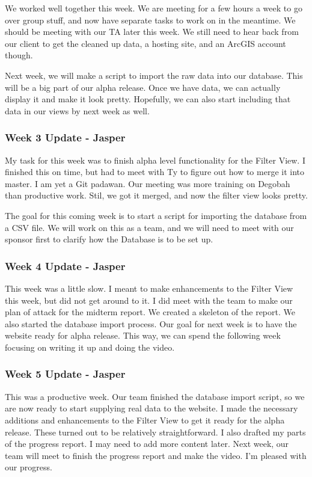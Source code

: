 We worked well together this week. 
We are meeting for a few hours a week to go over group stuff, and now have separate tasks to work on in the meantime. 
We should be meeting with our TA later this week. 
We still need to hear back from our client to get the cleaned up data, a hosting site, and an ArcGIS account though.

Next week, we will make  a script to import the raw data into our database. 
This will be a big part of our alpha release. 
Once we have data, we can actually display it and make it look pretty. 
Hopefully, we can also start including that data in our views by next week as well.

\subsubsection{Week 3 Update - Jasper}
My task for this week was to finish alpha level functionality for the Filter View. 
I finished this on time, but had to meet with Ty to figure out how to merge it into master. 
I am yet a Git padawan. 
Our meeting was more training on Degobah than productive work. 
Stil, we got it merged, and now the filter view looks pretty.

The goal for this coming week is to start a script for importing the database from a CSV file. 
We will work on this as a team, and we will need to meet with our sponsor first to clarify how the Database is to be set up.

\subsubsection{Week 4 Update - Jasper}
This week was a little slow. 
I meant to make enhancements to the Filter View this week, but did not get around to it. 
I did meet with the team to make our plan of attack for the midterm report. 
We created a skeleton of the report. 
We also started the database import process. 
Our goal for next week is to have the website ready for alpha release. 
This way, we can spend the following week focusing on writing it up and doing the video.​

\subsubsection{Week 5 Update - Jasper}
This was a productive week. 
Our team finished the database import script, so we are now ready to start supplying real data to the website. 
I made the necessary additions and enhancements to the Filter View to get it ready for the alpha release. 
These turned out to be relatively straightforward. 
I also drafted my parts of the progress report. 
I may need to add more content later. 
Next week, our team will meet to finish the progress report and make the video.​ I'm pleased with our progress.

